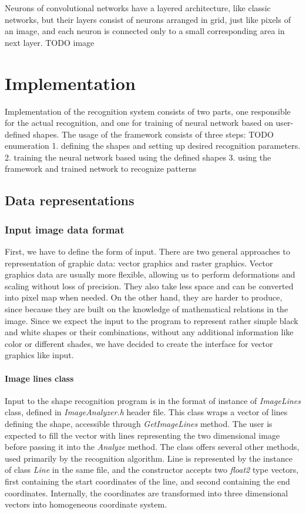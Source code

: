 Neurons of convolutional networks have a layered architecture, like classic networks, but their layers consist of neurons arranged in grid, just like pixels of an image, and each neuron is connected only to a small corresponding area in next layer.  
TODO image
\chapter{Implementation}
Implementation of the recognition system consists of two parts, one responsible for the actual recognition, and one for training of neural network based on user-defined shapes. The usage of the framework consists of three steps: TODO enumeration
1. defining the shapes and setting up desired recognition parameters.
2. training the neural network based using the defined shapes
3. using the framework and trained network to recognize patterns

\section{Data representations}

\subsection{Input image data format}
First, we have to define the form of input. There are two general approaches to representation of graphic data: vector graphics and raster graphics. Vector graphics data are usually more flexible, allowing us to perform deformations and scaling without loss of precision. They also take less space and can be converted into pixel map when needed. On the other hand, they are harder to produce, since because they are built on the knowledge of mathematical relations in the image. Since we expect the input to the program to represent rather simple black and white shapes or their combinations, without any additional information like color or different shades, we have decided to create the interface for vector graphics like input.

\subsubsection{Image lines class}
Input to the shape recognition program is in the format of instance of \emph{ImageLines} class, defined in \emph{ImageAnalyzer.h} header file. This class wraps a vector of lines defining the shape, accessible through \emph{GetImageLines} method. The user is expected to fill the vector with lines representing the two dimensional image before passing it into the \emph{Analyze} method. The class offers several other methods, used primarily by the recognition algorithm. 
Line is represented by the instance of class \emph{Line} in the same file, and the constructor accepts two \emph{float2} type vectors, first containing the start coordinates of the line, and second containing the end coordinates. Internally, the coordinates are transformed into three dimensional vectors into homogeneous coordinate system. 

